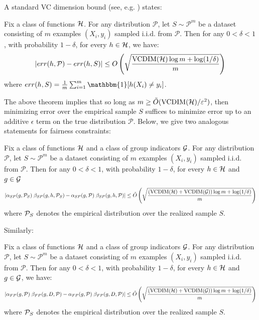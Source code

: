 A standard VC dimension bound (see, e.g. \cite{KV94}) states:
\begin{theorem}
  Fix a class of functions $\mathcal{H}$. For any distribution $\mathcal{P}$,
  let $S \sim \mathcal{P}^m$ be a dataset consisting of $m$ examples
  $(X_i, y_i)$ sampled i.i.d. from $\mathcal{P}$. Then for any
  $0 < \delta < 1$, with probability $1-\delta$, for every
  $h \in \mathcal{H}$, we have:
$$\left|err(h, \mathcal{P}) - err(h, S) \right| \leq O\left(\sqrt{\frac{\mathrm{VCDIM}(\mathcal{H})\log m + \log(1/\delta)}{m}} \right)$$
where
$err(h, S) = \frac{1}{m}\sum_{i=1}^m \mathbbm{1}[h(X_i) \neq y_i]$.
\end{theorem}

The above theorem implies that so long as $m \geq \tilde O(\mathrm{VCDIM}(\mathcal{H})/\varepsilon^2)$, then minimizing error over the empirical sample $S$ suffices to minimize error up to an additive $\epsilon$ term on the true distribution $\mathcal{P}$. Below, we give two analogous statements for fairness constraints:
\begin{theorem}
\label{thm:SP-uc}
Fix a class of functions $\mathcal{H}$ and a class of group indicators
$\mathcal{G}$. For any distribution $\mathcal{P}$, let $S \sim \mathcal{P}^m$
be a dataset consisting of $m$ examples $(X_i, y_i)$ sampled
i.i.d. from $\mathcal{P}$. Then for any $0 < \delta < 1$, with
probability $1-\delta$, for every $h \in \mathcal{H}$ and $g \in \mathcal{G}$
\[
  \left| \alpha_{SP}(g, \mathcal{P}_S) \; \beta_{SP}(g, h, \mathcal{P}_S) - {\alpha_{SP}(g, \mathcal{P}) \;
      \beta_{SP}(g, h, \mathcal{P})}\right| \leq
  \tilde{O}\left(\sqrt{\frac{(\mathrm{VCDIM}(\mathcal{H}) +
        \mathrm{VCDIM}(\mathcal{G}))\log m + \log(1/\delta)}{m}} \right)
\]
where $\mathcal{P}_S$ denotes the empirical distribution over the realized
sample $S$.
\end{theorem}

Similarly:
\begin{theorem}
\label{thm:FP-uc}
Fix a class of functions $\mathcal{H}$ and a class of group indicators
$\mathcal{G}$. For any distribution $\mathcal{P}$, let $S \sim \mathcal{P}^m$
be a dataset consisting of $m$ examples $(X_i, y_i)$ sampled
i.i.d. from $\mathcal{P}$. Then for any $0 < \delta < 1$, with
probability $1-\delta$, for every $h \in \mathcal{H}$ and $g \in \mathcal{G}$, we
have:
$$
\left| \alpha_{FP}(g, \mathcal{P}) \; \beta_{FP}(g, D, \mathcal{P}) - {\alpha_{FP}(g, \mathcal{P}) \;
    \beta_{FP}(g, D, \mathcal{P})}\right| \leq
\tilde{O}\left(\sqrt{\frac{(\mathrm{VCDIM}(\mathcal{H}) +
      \mathrm{VCDIM}(\mathcal{G}))\log m + \log(1/\delta)}{m}} \right)$$ where
$\mathcal{P}_S$ denotes the empirical distribution over the realized sample
$S$.
\end{theorem}

